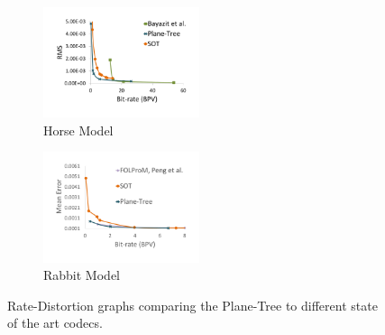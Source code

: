 \begin{figure}[!htb]
        \begin{subfigure}[b]{1.8in}
                \includegraphics[width=1.8in]{images/results/compression/horsesota}
                \caption{Horse Model}
                \label{fig:SA_HORSE}
        \end{subfigure}%
        \begin{subfigure}[b]{1.8in}
                \includegraphics[width=1.8in]{images/results/compression/rabbitsota}
                \caption{Rabbit Model}
                \label{fig:SA_RABBIT}
        \end{subfigure}
       \caption{Rate-Distortion graphs comparing the Plane-Tree to different state of the art codecs.}
       \label{fig:SOTAEXPS}
\end{figure}